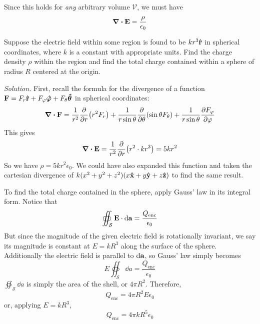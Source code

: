 Since this holds for \textit{any} arbitrary volume $\mathcal V$, we must have
\begin{equation} \label{gauss' law, differential}
    \div \mathbf{E} = \frac{\rho}{\epsilon_0}
\end{equation}
\begin{example}
    Suppose the electric field within some region is found to be $kr^3\mathbf{\hat{r}}$ in spherical coordinates, where $k$ is a constant with appropriate units. Find the charge density $\rho$ within the region and find the total charge contained within a sphere of radius $R$ centered at the origin.

    \textit{Solution.} First, recall the formula for the divergence of a function $\mathbf{F} = F_r\mathbf{\hat{r}} + F_\varphi \boldsymbol{\hat {\varphi}} + F_\theta \boldsymbol{\hat\theta}$ in spherical coordinates:
    \[ \div \mathbf{F} = \frac{1}{r^2}\pdv{r} (r^2F_r) + \frac{1}{r\sin\theta}\pdv{\theta}(\sin\theta F_\theta) + \frac{1}{r\sin\theta} \pdv{F_\varphi}{\varphi}\]
    This gives
    \begin{align*}
        \div \mathbf{E} = \frac{1}{r^2} \pdv{r} (r^2 \cdot kr^3) = 5kr^2
    \end{align*}
    So we have $\rho = 5kr^2\epsilon_0$. We could have also expanded this function and taken the cartesian divergence of $k(x^2+y^2+z^2)(x\mathbf{\hat{x}} + y\mathbf{\hat{y}} + z\mathbf{\hat{z}})$ to find the same result.

    To find the total charge contained in the sphere, apply Gauss' law in its integral form. Notice that
    \[ \oiint_\mathcal{S} \mathbf{E} \cdot \dd \mathbf{a} = \frac{Q_\text{enc}}{\epsilon_0}\]
    But since the magnitude of the given electric field is rotationally invariant, we say its magnitude is constant at $E = kR^3$ along the surface of the sphere. Additionally the electric field is parallel to $\dd \mathbf{a}$, so Gauss' law simply becomes
    \[ E\oiint_\mathcal{S}\dd a = \frac{Q_\text{enc}}{\epsilon_0} \]
    $\oiint_\mathcal{S} \dd a$ is simply the area of the shell, or $4\pi R^2$. Therefore,
    \[ Q_\text{enc} = 4\pi R^2 E\epsilon_0 \]
    or, applying $E = kR^3$,
    \[ Q_\text{enc} = 4\pi k R^5 \epsilon_0 \]
\end{example}
